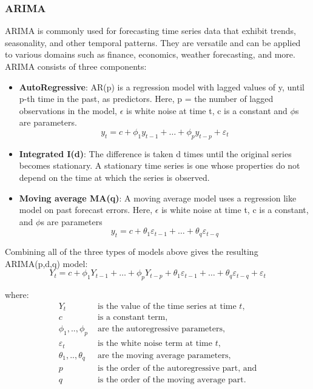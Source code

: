 \documentclass{ieeeojies}
\begin{document}
\subsubsection{\textbf{ARIMA}}
\hspace{1em}ARIMA is commonly used for forecasting time series data that exhibit trends, seasonality, and other temporal patterns. They are versatile and can be applied to various domains such as finance, economics, weather forecasting, and more. ARIMA consists of three components:
\begin{itemize}
    \item \textbf{AutoRegressive}: AR(p) is a regression model with lagged values of y, until p-th time in the past, as predictors. Here, p = the number of lagged observations in the model, $\epsilon$ is white noise at time t, c is a constant and $\phi$s are parameters.
    \[y_t = c + \phi_1 y_{t-1} + \ldots + \phi_p y_{t-p} + \varepsilon_t\]
    \item \textbf{Integrated I(d)}: The difference is taken d times until the original series becomes stationary. A stationary time series is one whose properties do not depend on the time at which the series is observed.
    
    \item \textbf{Moving average MA(q)}:  A moving average model uses a regression like model on past forecast errors. Here, $\epsilon$ is white noise at time t, c is a constant, and $\phi$s are parameters
    \[y_t = c + \theta_1 \varepsilon_{t-1} + \ldots + \theta_q \varepsilon_{t-q}\]
\end{itemize}
Combining all of the three types of models above gives the resulting ARIMA(p,d,q) model: \cite{a10}
\[Y_t = c + \phi_1 Y_{t-1} + \ldots + \phi_p Y_{t-p} + \theta_1 \varepsilon_{t-1} + \ldots + \theta_q \varepsilon_{t-q} + \varepsilon_t\]

where:
\begin{align*}
  Y_t & \text{ is the value of the time series at time } t, \\
  c & \text{ is a constant term,} \\
  \phi_1,.., \phi_p & \text{ are the autoregressive parameters,} \\
  \varepsilon_t & \text{ is the white noise term at time } t, \\
  \theta_1,.., \theta_q & \text{ are the moving average parameters,} \\
  p & \text{ is the order of the autoregressive part, and} \\
  q & \text{ is the order of the moving average part.}
\end{align*}
\end{document}
